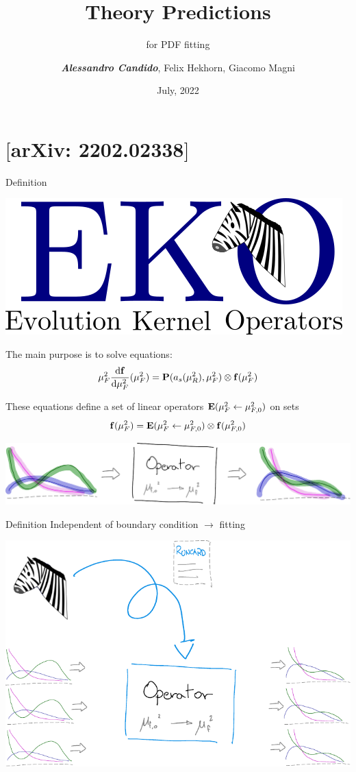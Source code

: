 \documentclass[9pt]{beamer}
\title{Theory Predictions}
\subtitle{for PDF fitting}
\date{July, 2022}
\author{\textit{\textbf{Alessandro Candido}}, Felix Hekhorn, Giacomo Magni}
\providecommand{\iRef}[1]{{\color{mLightGreen}\small $[$#1$]$}}
\begin{document}
\maketitle

\section{\eko{} \iRef{arXiv: 2202.02338}}

\begin{frame}{\eko{} Definition}
	\begin{center}
		\includegraphics[width=.35\linewidth]{eko}
	\end{center}

    The main purpose is to solve \textbf{\dglap} equations:
	\begin{equation*}
		\mu_F^2 \dv{\vb f}{\mu_F^2}{}(\mu_F^2) = \vb P (a_s(\mu_R^2),\mu_F^2) \otimes \vb f(\mu_F^2)
	\end{equation*}

    These equations define a set of linear operators $\vb E(\mu_F^2 \leftarrow
    \mu_{F,0}^2)$ on \textbf{\pdf} sets
	\begin{equation*}
		\vb f(\mu_F^2) = \vb E(\mu_F^2 \leftarrow \mu_{F,0}^2) \otimes \vb f(\mu_{F,0}^2)
	\end{equation*}

    \vspace*{15pt}
	\begin{center}
		\includegraphics[width=0.7\linewidth]{ev-op}
	\end{center}
\end{frame}

\begin{frame}{\eko{} Definition}
    \vspace*{15pt}
    Independent of boundary condition $\to$ \pdf{} fitting

    \vspace*{25pt}
	\begin{center}
		\includegraphics[width=0.7\linewidth]{compute-ev-op-zebra}
	\end{center}
\end{frame}
\end{document}
